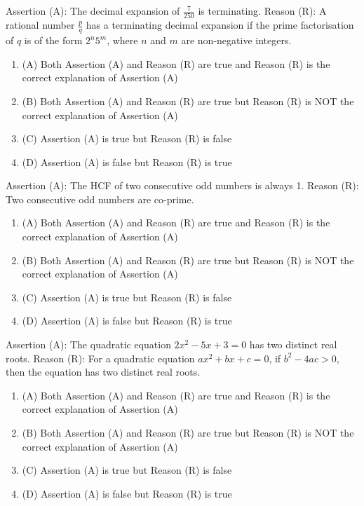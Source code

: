 \documentclass[12pt,a4paper]{exam}
\begin{document}
\begin{questions}
\question[1] Assertion (A): The decimal expansion of $\frac{7}{250}$ is terminating.
Reason (R): A rational number $\frac{p}{q}$ has a terminating decimal expansion if the prime factorisation of $q$ is of the form $2^n 5^m$, where $n$ and $m$ are non-negative integers.
\begin{enumerate}[label=(\Alph*)]
  \item (A) Both Assertion (A) and Reason (R) are true and Reason (R) is the correct explanation of Assertion (A)
  \item (B) Both Assertion (A) and Reason (R) are true but Reason (R) is NOT the correct explanation of Assertion (A)
  \item (C) Assertion (A) is true but Reason (R) is false
  \item (D) Assertion (A) is false but Reason (R) is true
\end{enumerate}
\vspace{0.15cm}

\question[1] Assertion (A): The HCF of two consecutive odd numbers is always 1.
Reason (R): Two consecutive odd numbers are co-prime.
\begin{enumerate}[label=(\Alph*)]
  \item (A) Both Assertion (A) and Reason (R) are true and Reason (R) is the correct explanation of Assertion (A)
  \item (B) Both Assertion (A) and Reason (R) are true but Reason (R) is NOT the correct explanation of Assertion (A)
  \item (C) Assertion (A) is true but Reason (R) is false
  \item (D) Assertion (A) is false but Reason (R) is true
\end{enumerate}
\vspace{0.15cm}

\question[1] Assertion (A): The quadratic equation $2x^2 - 5x + 3 = 0$ has two distinct real roots.
Reason (R): For a quadratic equation $ax^2 + bx + c = 0$, if $b^2 - 4ac > 0$, then the equation has two distinct real roots.
\begin{enumerate}[label=(\Alph*)]
  \item (A) Both Assertion (A) and Reason (R) are true and Reason (R) is the correct explanation of Assertion (A)
  \item (B) Both Assertion (A) and Reason (R) are true but Reason (R) is NOT the correct explanation of Assertion (A)
  \item (C) Assertion (A) is true but Reason (R) is false
  \item (D) Assertion (A) is false but Reason (R) is true
\end{enumerate}
\vspace{0.15cm}


\end{questions}
\end{document}
